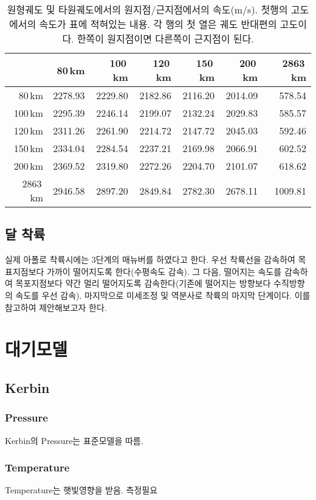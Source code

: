 \begin{table}[h]
\caption{원형궤도 및 타원궤도에서의 원지점/근지점에서의 속도(m/s). 첫행의 고도에서의 속도가 표에 적혀있는 내용. 각 행의 첫 열은 궤도 반대편의 고도이다. 한쪽이 원지점이면 다른쪽이 근지점이 된다.}
\begin{tabular}{|r|r|r|r|r|r|r|}
\hline
&80\,km&100\,km&120\,km&150\,km&200\,km&2863\,km
\\\hline
80\,km&2278.93&2229.80&2182.86&2116.20&2014.09&578.54%
\\\hline
100\,km&2295.39&2246.14&2199.07&2132.24&2029.83&585.57%
\\\hline
120\,km&2311.26&2261.90&2214.72&2147.72&2045.03&592.46%
\\\hline
150\,km&2334.04&2284.54&2237.21&2169.98&2066.91&602.52%
\\\hline
200\,km&2369.52&2319.80&2272.26&2204.70&2101.07&618.62%
\\\hline
2863\,km&2946.58&2897.20&2849.84&2782.30&2678.11&1009.81
\\\hline
\end{tabular}
\end{table}
\section{달 착륙}
실제 아폴로 착륙시에는 3단계의 매뉴버를 하였다고 한다. 우선 착륙선을 감속하여 목표지점보다 가까이 떨어지도록 한다(수평속도 감속). 그 다음, 떨어지는 속도를 감속하여 목포지점보다 약간 멀리 떨어지도록 감속한다(기존에 떨어지는 방향보다 수직방향의 속도를 우선 감속). 마지막으로 미세조정 및 역분사로 착륙의 마지막 단계이다. 이를 참고하여 제안해보고자 한다.


\chapter{대기모델}%
\section{Kerbin}
\subsection{Pressure}
Kerbin의 Pressure는 표준모델을 따름.
\subsection{Temperature}
Temperature는 햇빛영향을 받음. 측정필요